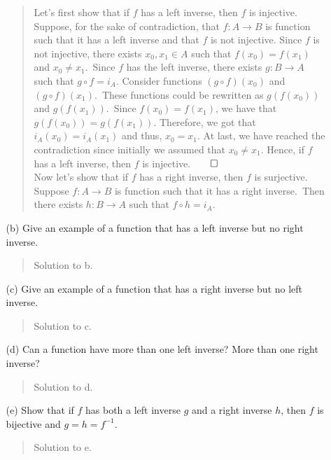 \documentclass[12pt, a4paper]{article}
\newcommand{\rarr}{\rightarrow}
\begin{document}
\begin{itemize}
\begin{itemize}
\begin{quote}
Let's first show that if $f$ has a left inverse, then $f$ is injective.\\
\medskip
Suppose, for the sake of contradiction, that $f : A \rarr B$ is function such that it has a left inverse
and that $f$ is not injective. Since $f$ is not injective, there exists $x_0, x_1 \in A$ such that $f(x_0) = f(x_1)$ and $x_0 \neq x_1$.\
Since $f$ has the left inverse, there exists $g : B \rarr A$ such that $g \circ f = i_A$.
Consider functions $(g \circ f)(x_0)$ and $(g \circ f)(x_1)$.\ These functions could be rewritten as
$g(f(x_0))$ and $g(f(x_1))$.\ Since $f(x_0) = f(x_1)$, we have that $g(f(x_0)) = g(f(x_1))$. Therefore,
we got that $i_A(x_0) = i_A(x_1)$ and thus, $x_0 = x_1$. At last, we have reached the contradiction since initially we assumed that $x_0 \neq x_1$.
Hence, if $f$ has a left inverse, then $f$ is injective.$\qed$
\\
\bigskip
Now let's show that if $f$ has a right inverse, then $f$ is surjective.\\
\medskip
Suppose $f : A \rarr B$ is function such that it has a right inverse.\
Then there exists $h : B \rarr A$ such that $f \circ h = i_A$.
\end{quote}

\item[]

\item[(b)]
Give an example of a function that has a left inverse but no right inverse.
\begin{quote}
Solution to b.
\end{quote}

\item[]

\item[(c)]
Give an example of a function that has a right inverse but no left inverse.
\begin{quote}
Solution to c.
\end{quote}

\item[]

\item[(d)]
Can a function have more than one left inverse? More than one right inverse?
\begin{quote}
Solution to d.
\end{quote}

\item[]

\item[(e)]
Show that if $f$ has both a left inverse $g$ and a right inverse $h$, then $f$
is bijective and $g = h = f^{-1}$.
\begin{quote}
Solution to e.
\end{quote}

\end{itemize}

\end{itemize}
\end{document}

